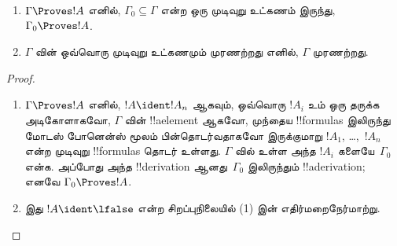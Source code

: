 \documentclass[../../../include/open-logic-section]{subfiles}
\begin{document}
\begin{prop}[இறுக்கத்தன்மை]
  \begin{enumerate}
  \item $\Gamma \Proves !A$ எனில், $\Gamma_0 \subseteq \Gamma$ என்ற ஒரு
    முடிவுறு உட்கணம் இருந்து, $\Gamma_0 \Proves !A$.
  \item $\Gamma$ வின் ஒவ்வொரு முடிவுறு உட்கணமும் முரணற்றது எனில்,
    $\Gamma$ முரணற்றது.
  \end{enumerate}
\end{prop}

\begin{proof}
  \begin{enumerate}
    \item $\Gamma \Proves !A$ எனில், $!A \ident !A_n$ ஆகவும், ஒவ்வொரு
      $!A_i$ உம் ஒரு தருக்க அடிகோளாகவோ, $\Gamma$ வின் !!a{element} ஆகவோ,
      முந்தைய !!{formula}s இலிருந்து மோடஸ் போனென்ஸ் மூலம் பின்தொடர்வதாகவோ
      இருக்குமாறு $!A_1$, \dots,~$!A_n$ என்ற முடிவுறு !!{formula}s தொடர்
      உள்ளது. $\Gamma$ வில் உள்ள அந்த $!A_i$ களையே~$\Gamma_0$ என்க.
      அப்போது அந்த !!{derivation} ஆனது~$\Gamma_0$ இலிருந்தும்
      !!a{derivation}; எனவே $\Gamma_0 \Proves !A$.
    \item இது $!A \ident \lfalse$ என்ற சிறப்புநிலையில் (1) இன்
      எதிர்மறைநேர்மாற்று.
\end{enumerate}
\end{proof}
\end{document}
